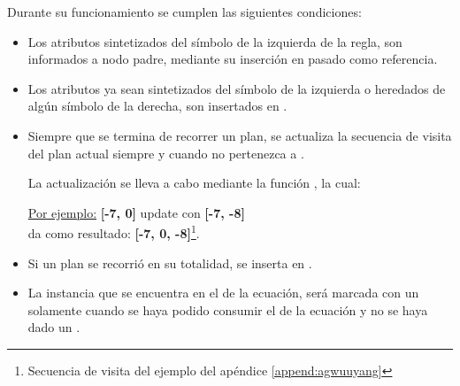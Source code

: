 Durante su funcionamiento se cumplen las siguientes condiciones:
\begin{itemize}
\item Los atributos sintetizados del símbolo de la izquierda de la regla, son informados a nodo padre, mediante su inserción en  pasado como referencia.

\item Los atributos ya sean sintetizados del símbolo de la izquierda o heredados de algún símbolo de la derecha, son insertados en .

\item Siempre que se termina de recorrer un plan, se actualiza la secuencia de visita del plan actual siempre y cuando no pertenezca a .

La actualización se lleva a cabo mediante la función , la cual:

\underline{Por ejemplo:}\hspace*{1cm} \textbf{[-7, 0]} update con \textbf{[-7, -8]}\\
\hspace*{2.8cm} da como resultado: \textbf{[-7, 0, -8]}\footnote{Secuencia de visita del ejemplo del apéndice \ref{append:agwuuyang}}.

\item Si un plan se recorrió en su totalidad, se inserta en .

\item La instancia que se encuentra en el  de la ecuación, será marcada con un  solamente cuando se haya podido consumir el  de la ecuación y no se haya dado un .


\end{itemize}
